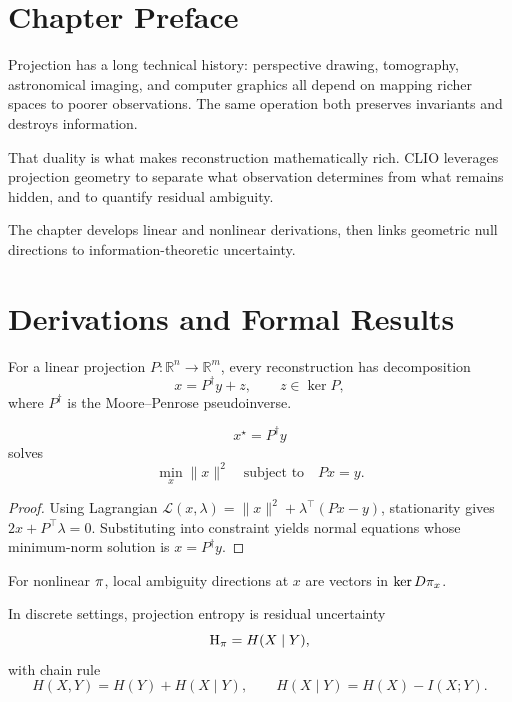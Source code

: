 \section{Chapter Preface}
Projection has a long technical history: perspective drawing, tomography, astronomical imaging, and computer graphics all depend on mapping richer spaces to poorer observations. The same operation both preserves invariants and destroys information.

That duality is what makes reconstruction mathematically rich. CLIO leverages projection geometry to separate what observation determines from what remains hidden, and to quantify residual ambiguity.

The chapter develops linear and nonlinear derivations, then links geometric null directions to information-theoretic uncertainty.

\section{Derivations and Formal Results}
For a linear projection \(P:\mathbb R^n\to\mathbb R^m\), every reconstruction has decomposition
\[
x=P^\dagger y + z,\qquad z\in\ker P,
\]
where \(P^\dagger\) is the Moore--Penrose pseudoinverse.

\begin{proposition}
\[
x^\star=P^\dagger y
\]
solves
\[
\min_x \|x\|^2\quad\text{subject to}\quad Px=y.
\]
\end{proposition}

\begin{proof}
Using Lagrangian \(\mathcal L(x,\lambda)=\|x\|^2+\lambda^\top(Px-y)\), stationarity gives \(2x+P^\top\lambda=0\). Substituting into constraint yields normal equations whose minimum-norm solution is \(x=P^\dagger y\).
\end{proof}

\begin{definition}
For nonlinear \(\pi\), local ambiguity directions at \(x\) are vectors in \(\ker D\pi_x\).
\end{definition}

\begin{definition}
In discrete settings, projection entropy is residual uncertainty
\[
\mathrm{H}_{\pi}=H(X\mid Y),
\]
with chain rule
\[
H(X,Y)=H(Y)+H(X\mid Y),\qquad H(X\mid Y)=H(X)-I(X;Y).
\]
\end{definition}
